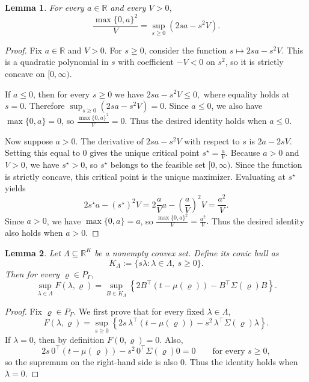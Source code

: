 \documentclass[12pt,leqno,titlepage]{amsart}
\newcommand{\1}{\mathbbm{1}}
\newtheorem{lemma}{Lemma}
\begin{document}
\begin{bibunit}
\begin{lemma}
\label{lem:scalar_positive_part_identity}
For every $a\in\mathbb R$ and every $V>0$,
\[
\frac{\max\{0,a\}^2}{V}
=
\sup_{s\ge 0}\left(2sa-s^2V\right).
\]
\end{lemma}

\begin{proof}
Fix $a\in\mathbb R$ and $V>0$. For $s\ge 0$, consider the function
$
s\longmapsto 2sa-s^2V.%
$
This is a quadratic polynomial in $s$ with coefficient $-V<0$ on $s^2$, so it
is strictly concave on $[0,\infty)$.

If $a\le 0$, then for every $s\ge 0$ we have
$
2sa-s^2V \le 0,
$
where  equality holds at $s=0$. Therefore
$
\sup_{s\ge 0}(2sa-s^2V)=0.
$
Since $a\le 0$, we also have $\max\{0,a\}=0$, so
$
\frac{\max\{0,a\}^2}{V}=0.
$
Thus the desired identity holds when $a\le 0$.

Now suppose $a>0$. The derivative of $2sa-s^2V$ with respect to $s$ is
$
2a-2sV.
$
Setting this equal to $0$ gives the unique critical point
$
s^\star=\frac{a}{V}.
$
Because $a>0$ and $V>0$, we have $s^\star>0$, so $s^\star$ belongs to the
feasible set $[0,\infty)$. Since the function is strictly concave, this critical
point is the unique maximizer. Evaluating at $s^\star$ yields
\[
2s^\star a-(s^\star)^2V
=
2\frac{a}{V}a-\left(\frac{a}{V}\right)^2V
=
\frac{a^2}{V}.
\]
Since $a>0$, we have $\max\{0,a\}=a$, so
$
\frac{\max\{0,a\}^2}{V}=\frac{a^2}{V}.
$
Thus the desired identity also holds when $a>0$.
\end{proof}


\begin{lemma}
\label{lem:cone_reformulation}
Let $\Lambda\subseteq\mathbb R^K$ be a nonempty convex set. Define its
conic hull as
\[
K_\Lambda := \{s\lambda : \lambda\in\Lambda,\ s\ge 0\}.
\]
Then for every $\varrho\in P_\Gamma$,
\[
\sup_{\lambda\in\Lambda} F(\lambda,\varrho)
=
\sup_{B\in K_\Lambda}
\left\{
2B^\top(t-\mu(\varrho))-B^\top\Sigma(\varrho)B
\right\}.
\]
\end{lemma}





\begin{proof}
Fix $\varrho\in P_\Gamma$. We first prove that for every fixed
$\lambda\in\Lambda$,
\[
F(\lambda,\varrho)
=
\sup_{s\ge 0}
\left\{
2s\,\lambda^\top(t-\mu(\varrho))
-
s^2\,\lambda^\top\Sigma(\varrho)\lambda
\right\}.
\]
If $\lambda=0$, then by definition $F(0,\varrho)=0$. Also,
\[
2s\,0^\top(t-\mu(\varrho))-s^2\,0^\top\Sigma(\varrho)0=0
\qquad\text{for every } s\ge 0,
\]
so the supremum on the right-hand side is also $0$. Thus the identity holds
when $\lambda=0$.


\end{proof}
\end{bibunit}
\end{document}
